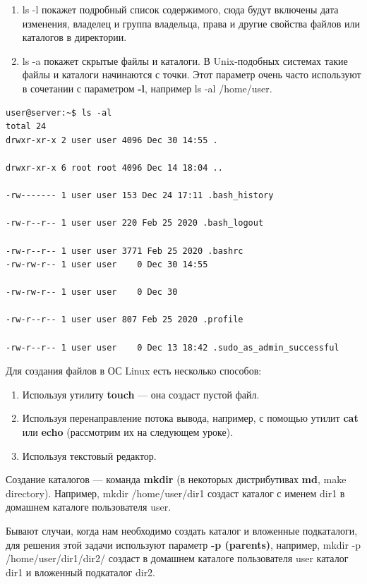 \documentclass[14pt, a4paper]{article}
\begin{document}
\begin{enumerate}
    \item \colorbox{backcolour}{ls -l} покажет подробный список содержимого, сюда будут включены дата изменения,
    владелец и группа владельца, права и другие свойства файлов или каталогов в директории.
    \item \colorbox{backcolour}{ls -a} покажет скрытые файлы и каталоги. В Unix-подобных системах такие файлы и каталоги
    начинаются с точки. Этот параметр очень часто используют в сочетании с параметром \textbf{-l},
    например \colorbox{backcolour}{ls -al /home/user}.
\end{enumerate}
\begin{lstlisting}
user@server:~$ ls -al
total 24
drwxr-xr-x 2 user user 4096 Dec 30 14:55 .

drwxr-xr-x 6 root root 4096 Dec 14 18:04 ..

-rw------- 1 user user 153 Dec 24 17:11 .bash_history

-rw-r--r-- 1 user user 220 Feb 25 2020 .bash_logout

-rw-r--r-- 1 user user 3771 Feb 25 2020 .bashrc
-rw-rw-r-- 1 user user    0 Dec 30 14:55

-rw-rw-r-- 1 user user    0 Dec 30

-rw-r--r-- 1 user user 807 Feb 25 2020 .profile

-rw-r--r-- 1 user user    0 Dec 13 18:42 .sudo_as_admin_successful
\end{lstlisting}

Для создания файлов в ОС Linux есть несколько способов:

\begin{enumerate}
    \item Используя утилиту \textbf{touch} — она создаст пустой файл.
    \item Используя перенаправление потока вывода, например, с помощью утилит \textbf{cat} или \textbf{echo}
    (рассмотрим их на следующем уроке).
    \item Используя текстовый редактор.
\end{enumerate}

Создание каталогов — команда \textbf{mkdir} (в некоторых дистрибутивах \textbf{md}, make directory).
Например, \colorbox{backcolour}{mkdir /home/user/dir1} создаст каталог с именем dir1 в домашнем каталоге
пользователя user.

Бывают случаи, когда нам необходимо создать каталог и вложенные подкаталоги, для
решения этой задачи используют параметр \textbf{-p (parents)}, например, \colorbox{backcolour}{mkdir -p
/home/user/dir1/dir2/} создаст в домашнем каталоге пользователя user каталог dir1 и вложенный
подкаталог dir2.
\end{document}
